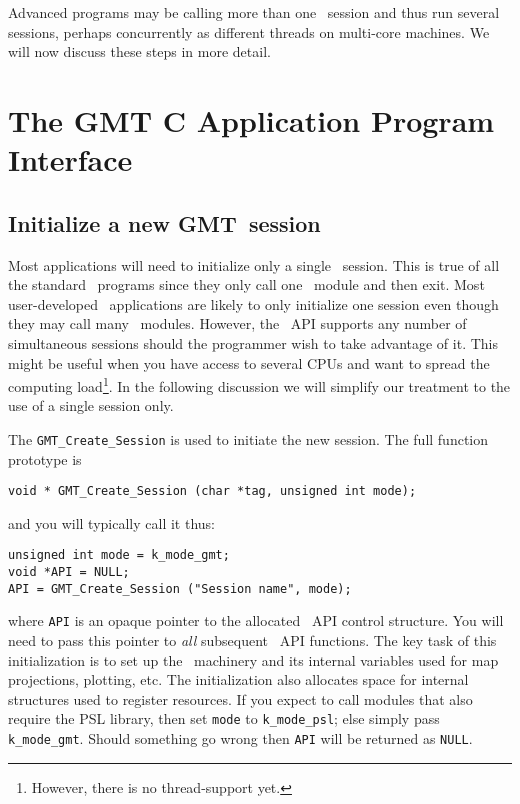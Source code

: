 \documentclass[11pt]{report}
\begin{document}
Advanced programs may be calling more than one \GMT\ session and thus run several
sessions, perhaps  concurrently as different threads on multi-core machines.
We will now discuss these steps in more detail.

\chapter{The GMT C Application Program Interface}

\section{Initialize a new GMT\ session}

Most applications will need to initialize only a single \GMT\ session.  This is true of all
the standard \GMT\ programs since they only call one \GMT\ module and then exit.  Most
user-developed \GMT\ applications are likely to only initialize one session even though
they may call many \GMT\ modules.  However, the \GMT\ API supports any number of
simultaneous sessions should the programmer wish to take advantage of it.  This
might be useful when you have access to several CPUs and want to spread the computing
load\footnote{However, there is no thread-support yet.}.
In the following discussion we will simplify our treatment to the use
of a single session only.

The \texttt{GMT\_Create\_Session} is used to initiate the new session.  The full
function prototype is

\begin{verbatim}
void * GMT_Create_Session (char *tag, unsigned int mode);
\end{verbatim}
and you will typically call it thus:
\begin{verbatim}
unsigned int mode = k_mode_gmt;
void *API = NULL;
API = GMT_Create_Session ("Session name", mode);
\end{verbatim}
where \texttt{API} is an opaque pointer to the allocated \GMT\ API control structure.  You will need to
pass this pointer to \emph{all} subsequent \GMT\ API functions.  The key task of this initialization
is to set up the \GMT\ machinery and its internal variables used for map projections, plotting,
etc.  The initialization also allocates space for internal structures used to register resources.
If you expect to call modules that also require the PSL library, then set \texttt{mode} to
\texttt{k\_mode\_psl}; else simply pass \texttt{k\_mode\_gmt}.  Should something go wrong then \texttt{API}
will be returned as \texttt{NULL}.
\end{document}
